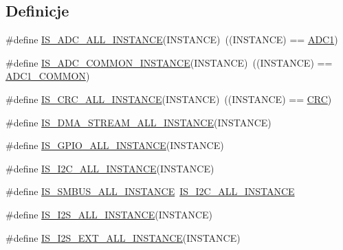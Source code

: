\subsection*{Definicje}
\begin{DoxyCompactItemize}
\item 
\#define \hyperlink{group___exported__macros_ga2204b62b378bcf08b3b9006c184c7c23}{I\+S\+\_\+\+A\+D\+C\+\_\+\+A\+L\+L\+\_\+\+I\+N\+S\+T\+A\+N\+CE}(I\+N\+S\+T\+A\+N\+CE)~((I\+N\+S\+T\+A\+N\+CE) == \hyperlink{group___peripheral__declaration_ga90d2d5c526ce5c0a551f533eccbee71a}{A\+D\+C1})
\item 
\#define \hyperlink{group___exported__macros_gad8a5831c786b6b265531b890a194cbe2}{I\+S\+\_\+\+A\+D\+C\+\_\+\+C\+O\+M\+M\+O\+N\+\_\+\+I\+N\+S\+T\+A\+N\+CE}(I\+N\+S\+T\+A\+N\+CE)~((I\+N\+S\+T\+A\+N\+CE) == \hyperlink{group___peripheral__declaration_gaf1919c64fc774aab31190346fd5457e2}{A\+D\+C1\+\_\+\+C\+O\+M\+M\+ON})
\item 
\#define \hyperlink{group___exported__macros_gaa514941a7f02f65eb27450c05e4e8dd1}{I\+S\+\_\+\+C\+R\+C\+\_\+\+A\+L\+L\+\_\+\+I\+N\+S\+T\+A\+N\+CE}(I\+N\+S\+T\+A\+N\+CE)~((I\+N\+S\+T\+A\+N\+CE) == \hyperlink{group___peripheral__declaration_ga4381bb54c2dbc34500521165aa7b89b1}{C\+RC})
\item 
\#define \hyperlink{group___exported__macros_gafd60def465da605e33644e28072aee9c}{I\+S\+\_\+\+D\+M\+A\+\_\+\+S\+T\+R\+E\+A\+M\+\_\+\+A\+L\+L\+\_\+\+I\+N\+S\+T\+A\+N\+CE}(I\+N\+S\+T\+A\+N\+CE)
\item 
\#define \hyperlink{group___exported__macros_ga783626dd2431afebea836a102e318957}{I\+S\+\_\+\+G\+P\+I\+O\+\_\+\+A\+L\+L\+\_\+\+I\+N\+S\+T\+A\+N\+CE}(I\+N\+S\+T\+A\+N\+CE)
\item 
\#define \hyperlink{group___exported__macros_gacdf0149a4e8c41a6814c13613c38a6b2}{I\+S\+\_\+\+I2\+C\+\_\+\+A\+L\+L\+\_\+\+I\+N\+S\+T\+A\+N\+CE}(I\+N\+S\+T\+A\+N\+CE)
\item 
\#define \hyperlink{group___exported__macros_ga85b79d63f4643c0de9a7519290a0eceb}{I\+S\+\_\+\+S\+M\+B\+U\+S\+\_\+\+A\+L\+L\+\_\+\+I\+N\+S\+T\+A\+N\+CE}~\hyperlink{group___exported__macros_gacdf0149a4e8c41a6814c13613c38a6b2}{I\+S\+\_\+\+I2\+C\+\_\+\+A\+L\+L\+\_\+\+I\+N\+S\+T\+A\+N\+CE}
\item 
\#define \hyperlink{group___exported__macros_ga0b35685911e3c7a38ee89e5cdc5a82fa}{I\+S\+\_\+\+I2\+S\+\_\+\+A\+L\+L\+\_\+\+I\+N\+S\+T\+A\+N\+CE}(I\+N\+S\+T\+A\+N\+CE)
\item 
\#define \hyperlink{group___exported__macros_ga2f0d621c72fe4e5039562472460e29ab}{I\+S\+\_\+\+I2\+S\+\_\+\+E\+X\+T\+\_\+\+A\+L\+L\+\_\+\+I\+N\+S\+T\+A\+N\+CE}(I\+N\+S\+T\+A\+N\+CE)

\end{DoxyCompactItemize}
